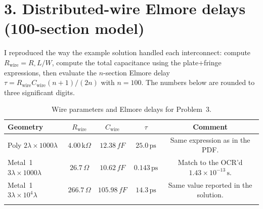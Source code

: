\documentclass[11pt]{article}
\newcommand{\ff}{\,\si{fF}}
\begin{document}
\section*{3. Distributed-wire Elmore delays (100-section model)}
I reproduced the way the example solution handled each interconnect: compute $R_{\text{wire}} = R_{\square}\,L/W$, compute the total capacitance using the plate+fringe expressions, then evaluate the $n$-section Elmore delay $\tau = R_{\text{wire}} C_{\text{wire}} (n+1)/(2n)$ with $n=100$. The numbers below are rounded to three significant digits.
\begin{table}[h]
  \centering
  \begin{tabular}{@{}lcccc@{}}\toprule
  Geometry & $R_{\text{wire}}$ & $C_{\text{wire}}$ & $\tau$ & Comment \\\midrule
  Poly $2\lambda\times1000\lambda$ & $4.00\,\text{k}\Omega$ & $12.38\ff$ & $25.0\,\text{ps}$ & Same expression as in the PDF. \\
  Metal~1 $3\lambda\times1000\lambda$ & $26.7\,\Omega$ & $10.62\ff$ & $0.143\,\text{ps}$ & Match to the OCR'd $1.43\times10^{-13}\,\text{s}$. \\
  Metal~1 $3\lambda\times10^4\lambda$ & $266.7\,\Omega$ & $105.98\ff$ & $14.3\,\text{ps}$ & Same value reported in the solution.\\\\\bottomrule
  \end{tabular}
  \caption{Wire parameters and Elmore delays for Problem~3.}
\end{table}
\end{document}

